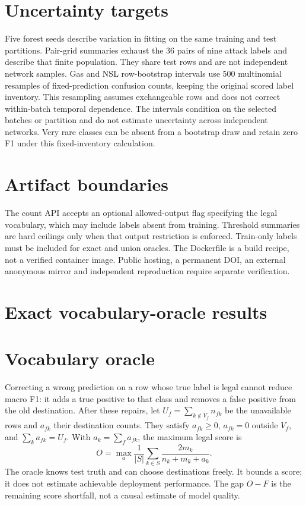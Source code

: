\documentclass{article}
\begin{document}
\section*{Uncertainty targets}
Five forest seeds describe variation in fitting on the same training and test partitions. Pair-grid summaries exhaust the 36 pairs of nine attack labels and describe that finite population. They share test rows and are not independent network samples. Gas and NSL row-bootstrap intervals use 500 multinomial resamples of fixed-prediction confusion counts, keeping the original scored label inventory. This resampling assumes exchangeable rows and does not correct within-batch temporal dependence. The intervals condition on the selected batches or partition and do not estimate uncertainty across independent networks. Very rare classes can be absent from a bootstrap draw and retain zero F1 under this fixed-inventory calculation.

\section*{Artifact boundaries}
The count API accepts an optional allowed-output flag specifying the legal vocabulary, which may include labels absent from training. Threshold summaries are hard ceilings only when that output restriction is enforced. Train-only labels must be included for exact and union oracles. The Dockerfile is a build recipe, not a verified container image. Public hosting, a permanent DOI, an external anonymous mirror and independent reproduction require separate verification.

\section*{Exact vocabulary-oracle results}
\section*{Vocabulary oracle}
Correcting a wrong prediction on a row whose true label is legal cannot reduce macro F1: it adds a true positive to that class and removes a false positive from the old destination. After these repairs, let \(U_f=\sum_{k\notin V_f}n_{fk}\) be the unavailable rows and \(a_{fk}\) their destination counts. They satisfy \(a_{fk}\ge0\), \(a_{fk}=0\) outside \(V_f\), and \(\sum_ka_{fk}=U_f\). With \(a_k=\sum_fa_{fk}\), the maximum legal score is
\[
O=\max_a\frac{1}{|S|}\sum_{k\in S}\frac{2m_k}{n_k+m_k+a_k}.
\]
The oracle knows test truth and can choose destinations freely. It bounds a score; it does not estimate achievable deployment performance. The gap \(O-F\) is the remaining score shortfall, not a causal estimate of model quality.
\end{document}
